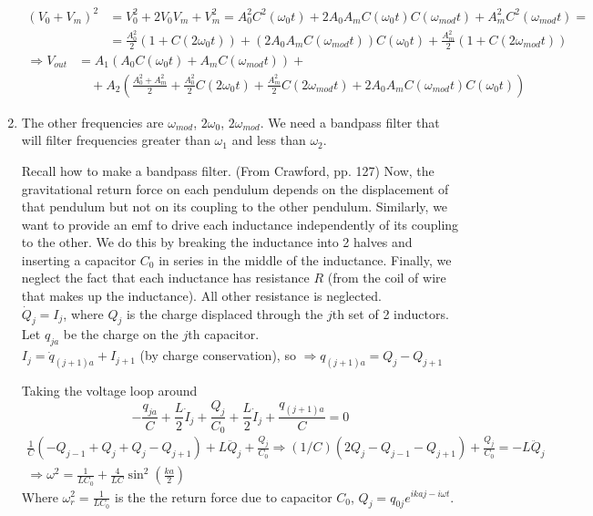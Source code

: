\documentclass[twoside,10pt]{amsart}
\begin{document}
\begin{enumerate}
$\begin{aligned}  (V_0 + V_m)^2 & = V_0^2 + 2V_0 V_m + V_m^2 = A_0^2 C^2(\omega_0 t) + 2 A_0 A_m C(\omega_0 t) C(\omega_{mod} t) + A_m^2 C^2(\omega_{mod} t) = \\
  & = \frac{A_0^2}{2} ( 1 + C(2 \omega_0 t) ) + (2 A_0 A_m C(\omega_{mod} t) )C(\omega_0 t ) + \frac{A_m^2}{2 } ( 1 + C(2 \omega_{mod} t ) )
\end{aligned}$ \\
$\begin{aligned}
  \Longrightarrow V_{out} & = A_1 ( A_0 C(\omega_0 t) + A_m C(\omega_{mod} t ) ) + \\
  & \quad + A_2 \left( \frac{A_0^2 + A_m^2 }{2 } + \frac{A_0^2}{2} C(2 \omega_0 t) + \frac{A_m^2}{2} C(2\omega_{mod} t) + 2A_0 A_m C(\omega_{mod} t )C(\omega_0 t) \right) \end{aligned}$
\item The other frequencies are $\omega_{mod}$, $2\omega_0$, $2\omega_{mod}$.  We need a bandpass filter that will filter frequencies greater than $\omega_1$ and less than $\omega_2$.  

Recall how to make a bandpass filter.  (From Crawford, pp. 127) Now, the gravitational return force on each pendulum depends on the displacement of that pendulum but not on its coupling to the other pendulum.  Similarly, we want to provide an emf to drive each inductance independently of its coupling to the other.  We do this by breaking the inductance into 2 halves and inserting a capacitor $C_0$ in series in the middle of the inductance.  Finally, we neglect the fact that each inductance has resistance $R$ (from the coil of wire that makes up the inductance).  All other resistance is neglected. \medskip \\
$\dot{Q}_j = I_j$, where $Q_j$ is the charge displaced through the $j$th set of 2 inductors.  Let $q_{ja}$ be the charge on the $j$th capacitor. \smallskip \\
$I_j = \dot{q}_{(j+1)a} + I_{j+1}$ (by charge conservation), so $\Longrightarrow q_{(j+1)a} = Q_j - Q_{j+1}$ 

Taking the voltage loop around 
\[
-\frac{q_{ja}}{C} + \frac{L}{2} \dot{I}_j + \frac{Q_j}{C_0} + \frac{L}{2} \dot{I}_j + \frac{q_{(j+1)a}}{C} = 0 
\]   
\[
\begin{gathered}
  \frac{1}{C} (-Q_{j-1} + Q_j + Q_j - Q_{j+1} ) + L \ddot{Q}_j + \frac{Q_j}{C_0} \Longrightarrow (1/C)(2Q_j - Q_{j-1} - Q_{j+1} ) + \frac{Q_j}{C_0} = -L \ddot{Q}_j \\
  \Longrightarrow \omega^2 = \frac{1}{LC_0} + \frac{4}{LC} \sin^2{ \left( \frac{ka}{2} \right)}
\end{gathered}
\]
Where $\omega_r^2 = \frac{1}{LC_0}$ is the the return force due to capacitor $C_0$, $Q_j = q_{0j} e^{ i kaj - i\omega t}$.  
\end{enumerate}
\end{document}
